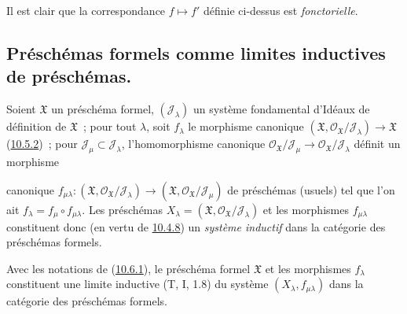 Il est clair que la correspondance $f\mapsto f'$ définie ci-dessus est
\emph{fonctorielle}.

\subsection{Préschémas formels comme limites inductives de préschémas.}
\label{subsection:I.10.6-fr}

\begin{env}[10.6.1]
\label{I.10.6.1-fr}
Soient $\mathfrak{X}$ un préschéma formel,
$(\mathscr{J}_\lambda)$ un système fondamental d'Idéaux de définition de
$\mathfrak{X}$~; pour tout $\lambda$, soit $f_\lambda$ le morphisme
canonique
$(\mathfrak{X},\mathscr{O}_{\mathfrak{X}}/\mathscr{J}_\lambda)
\to\mathfrak{X}$ (\hyperref[I.10.5.2-fr]{10.5.2})~; pour
$\mathscr{J}_\mu\subset\mathscr{J}_\lambda$, l'homomorphisme canonique
$\mathscr{O}_{\mathfrak{X}}/\mathscr{J}_\mu\to
\mathscr{O}_{\mathfrak{X}}/\mathscr{J}_\lambda$ définit un morphisme


canonique
$f_{\mu\lambda}:(\mathfrak{X},
\mathscr{O}_{\mathfrak{X}}/\mathscr{J}_\lambda)\to
(\mathfrak{X},\mathscr{O}_{\mathfrak{X}}/\mathscr{J}_\mu)$ de préschémas
(usuels) tel que l'on ait $f_\lambda=f_\mu\circ f_{\mu\lambda}$. Les
préschémas
$X_\lambda=(\mathfrak{X},
\mathscr{O}_{\mathfrak{X}}/\mathscr{J}_\lambda)$ et les morphismes
$f_{\mu\lambda}$ constituent donc (en vertu de
\hyperref[I.10.4.8-fr]{10.4.8}) un \emph{système inductif} dans la
catégorie des préschémas formels.
\end{env}

\begin{proposition}[10.6.2]
\label{I.10.6.2-fr}
Avec les notations de (\hyperref[I.10.6.1-fr]{10.6.1}), le préschéma
formel $\mathfrak{X}$ et les morphismes $f_\lambda$ constituent une
limite inductive (T, I, 1.8) du système $(X_\lambda,f_{\mu\lambda})$
dans la catégorie des préschémas formels.
\end{proposition}

